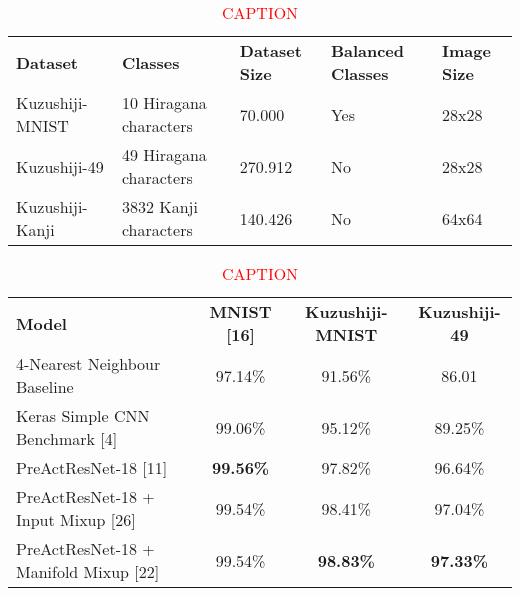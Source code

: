 \begin{table*}[h]
	\begin{tabular}{lllll}
		\rowcolor[HTML]{EFEFEF}
		\textbf{Dataset} & \textbf{Classes}       & \textbf{Dataset Size} & \textbf{Balanced Classes} & \textbf{Image Size} \\
		Kuzushiji-MNIST  & 10 Hiragana characters & 70.000                & Yes                       & 28x28               \\
		Kuzushiji-49     & 49 Hiragana characters & 270.912               & No                        & 28x28               \\
		Kuzushiji-Kanji  & 3832 Kanji characters  & 140.426               & No                        & 64x64
	\end{tabular}
	\caption{\textcolor{red}{CAPTION}}
	\label{tab:kuzushiji-struct}
\end{table*}

\begin{table*}[h]
	\begin{tabular}{lccc}
		\rowcolor[HTML]{EFEFEF}
		\textbf{Model}                            & \textbf{MNIST {[}16{]}} & \textbf{Kuzushiji-MNIST} & \textbf{Kuzushiji-49} \\
		4-Nearest Neighbour Baseline              & 97.14\%                 & 91.56\%                  & 86.01                 \\
		Keras Simple CNN Benchmark {[}4{]}        & 99.06\%                 & 95.12\%                  & 89.25\%               \\
		PreActResNet-18 {[}11{]}                  & \textbf{99.56\%}        & 97.82\%                  & 96.64\%               \\
		PreActResNet-18 + Input Mixup {[}26{]}    & 99.54\%                 & 98.41\%                  & 97.04\%               \\
		PreActResNet-18 + Manifold Mixup {[}22{]} & 99.54\%                 & \textbf{98.83\%}         & \textbf{97.33\%}
	\end{tabular}
	\caption{\textcolor{red}{CAPTION}}
	\label{tab:kuzushiji-benchmarks}
\end{table*}